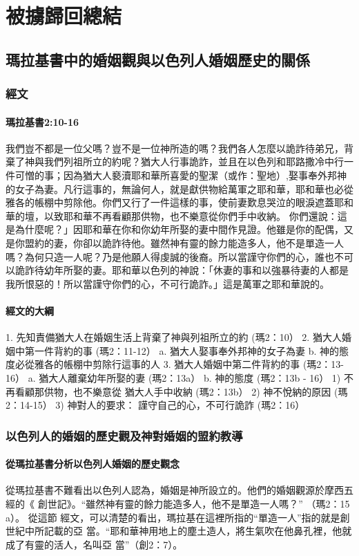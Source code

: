 \chapter{被擄歸回總結}

\section{瑪拉基書中的婚姻觀與以色列人婚姻歷史的關係}

\subsection{經文}
\subsubsection{瑪拉基書2:10-16}
我們豈不都是一位父嗎？豈不是一位神所造的嗎？我們各人怎麼以詭詐待弟兄，背棄了神與我們列祖所立的約呢？猶大人行事詭詐，並且在以色列和耶路撒冷中行一件可憎的事；因為猶大人褻瀆耶和華所喜愛的聖潔（或作：聖地）,娶事奉外邦神的女子為妻。凡行這事的，無論何人，就是獻供物給萬軍之耶和華，耶和華也必從雅各的帳棚中剪除他。你們又行了一件這樣的事，使前妻歎息哭泣的眼淚遮蓋耶和華的壇，以致耶和華不再看顧那供物，也不樂意從你們手中收納。 你們還說：這是為什麼呢？」因耶和華在你和你幼年所娶的妻中間作見證。他雖是你的配偶，又是你盟約的妻，你卻以詭詐待他。雖然神有靈的餘力能造多人，他不是單造一人嗎？為何只造一人呢？乃是他願人得虔誠的後裔。所以當謹守你們的心，誰也不可以詭詐待幼年所娶的妻。耶和華以色列的神說：「休妻的事和以強暴待妻的人都是我所恨惡的！所以當謹守你們的心，不可行詭詐。」這是萬軍之耶和華說的。 
\subsubsection{經文的大綱} 
1. 先知責備猶大人在婚姻生活上背棄了神與列祖所立的約 (瑪2：10） 
2. 猶大人婚姻中第一件背約的事  (瑪2：11-12） 
a. 猶大人娶事奉外邦神的女子為妻 
b. 神的態度必從雅各的帳棚中剪除行這事的人 
3. 猶大人婚姻中第二件背約的事  (瑪2：13-16） 
a. 猶大人離棄幼年所娶的妻  (瑪2：13a） 
b. 神的態度 (瑪2：13b - 16） 
1) 不再看顧那供物，也不樂意從 猶大人手中收納  (瑪2：13b） 
2) 神不悅納的原因 (瑪2：14-15） 
3) 神對人的要求： 謹守自己的心，不可行詭詐 (瑪2：16）

\subsection{以色列人的婚姻的歷史觀及神對婚姻的盟約教導}
\subsubsection{從瑪拉基書分析以色列人婚姻的歷史觀念}
從瑪拉基書不難看出以色列人認為，婚姻是神所設立的。他們的婚姻觀源於摩西五經的《
創世記》。“雖然神有靈的餘力能造多人，他不是單造一人嗎？” （瑪2：15 a）。 從這節
經文，可以清楚的看出，瑪拉基在這裡所指的“單造一人”指的就是創世紀中所記載的亞
當。“耶和華神用地上的塵土造人，將生氣吹在他鼻孔裡，他就成了有靈的活人，名叫亞
當”（創2：7）。

